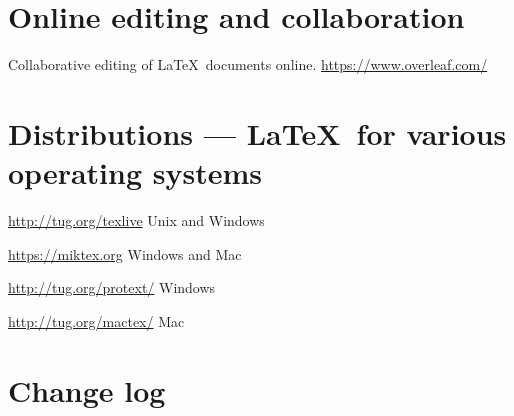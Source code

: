 \documentclass{article}
\def\LaTeX{LaTeX}%
\def\Dash{ --- }%
\renewcommand*{\LaTeX}{LaTeX}
\renewcommand*{\Dash}{ --- }
\begin{document}
\section{Online editing and collaboration}

\begin{description}[style=unboxed]
\item[Overleaf:] Collaborative editing of \LaTeX\ documents online.
    \url{https://www.overleaf.com/}
\end{description}


\section{Distributions \Dash \LaTeX\ for various operating systems}
\begin{description}[style=unboxed]
\item[TeXLive:] \url{http://tug.org/texlive} \hfill Unix and Windows
\item[MiKTex:] \url{https://miktex.org}  \hfill Windows and Mac
\item[proTeXt:] \url{http://tug.org/protext/}  \hfill Windows
\item[MacTex:] \url{http://tug.org/mactex/} \hfill Mac
\end{description}



\section{Change log}
\end{document}
